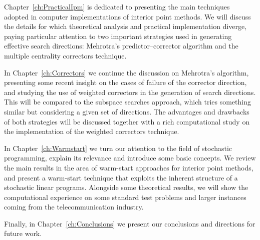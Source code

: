 Chapter~\ref{ch:PracticalIpm} is dedicated to presenting
the main techniques adopted in computer implementations of
interior point methods.
We will discuss the details for which 
theoretical analysis and practical implementation diverge,
paying particular attention to two important strategies used 
in generating effective search directions: 
Mehrotra's predictor--corrector algorithm and the
multiple centrality correctors technique.

In Chapter~\ref{ch:Correctors} we continue the discussion on
Mehrotra's algorithm, presenting some recent insight on the
cases of failure of the corrector direction, and studying the use of
weighted correctors in the generation of search directions. This will
be compared to the subspace searches approach, which tries something
similar but considering a given set of directions. The advantages
and drawbacks of both strategies will be discussed together with
a rich computational study on the implementation of the
weighted correctors technique.

In Chapter~\ref{ch:Warmstart} we turn our attention to the field
of stochastic programming, explain its relevance and introduce some
basic concepts.
We review the main results in the area of warm-start approaches
for interior point methods, and present a warm-start technique
that exploits the inherent structure of a stochastic linear programs.
Alongside some theoretical results, we will show the computational
experience on some standard test problems and larger instances coming
from the telecommunication industry.

Finally, in Chapter~\ref{ch:Conclusions} we present our conclusions
and directions for future work.
